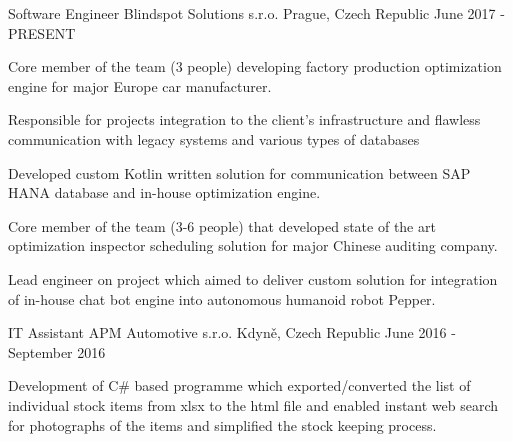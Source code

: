 


\begin{cventries}
		
		
	\cventry
	{Software Engineer} %
	{Blindspot Solutions s.r.o.} %
	{Prague, Czech Republic} %
	{June 2017 - PRESENT} %
	{ %
		\begin{cvitems}
			\item {Core member of the team (3 people) developing factory production optimization engine for major Europe car manufacturer.}
			\item {Responsible for projects integration to the client's infrastructure and flawless communication with legacy systems and various types of databases}
			\item {Developed custom Kotlin written solution for communication between SAP HANA database and in-house optimization engine. }
			\item {Core member of the team (3-6 people) that developed state of the art optimization inspector scheduling solution for major Chinese auditing company.}
			\item {Lead engineer on project which aimed to deliver custom solution for integration of in-house chat bot engine into autonomous humanoid robot Pepper. }
		\end{cvitems}
	}
	
		
	\cventry
	{IT Assistant} %
	{APM Automotive s.r.o.} %
	{Kdyně, Czech Republic} %
	{June 2016 - September 2016} %
	{ %
		\begin{cvitems}
			\item {Development of C\# based programme which exported/converted the list of individual stock items from xlsx to the html file and enabled instant web search for photographs of the items and simplified the stock keeping process.}
		\end{cvitems}
	}
			
\end{cventries}